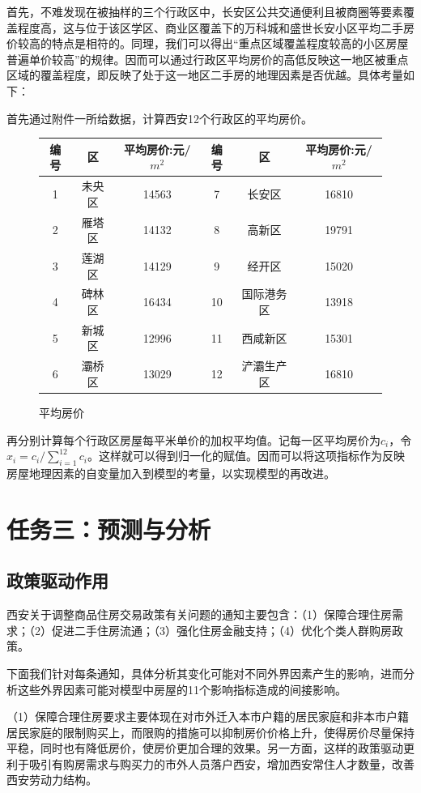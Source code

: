 \documentclass[withoutpreface,bwprint]{cumcmthesis} %
\begin{document}
首先，不难发现在被抽样的三个行政区中，长安区公共交通便利且被商圈等要素覆盖程度高，这与位于该区学区、商业区覆盖下的万科城和盛世长安小区平均二手房价较高的特点是相符的。同理，我们可以得出“重点区域覆盖程度较高的小区房屋普遍单价较高”的规律。因而可以通过行政区平均房价的高低反映这一地区被重点区域的覆盖程度，即反映了处于这一地区二手房的地理因素是否优越。具体考量如下：

首先通过附件一所给数据，计算西安12个行政区的平均房价。
\begin{figure}[H]
    \centering
    \begin{tabular}{cccccc}
    \toprule
    编号&区 & 平均房价:元/$m^2$&编号&区&平均房价:元/$m^2$\\
    \midrule
        1&未央区 & 14563 &7&长安区 & 16810 \\
        2&雁塔区 & 14132 &8&高新区 & 19791 \\
        3&莲湖区 & 14129 &9&经开区 & 15020 \\
        4&碑林区 & 16434 &10&国际港务区 & 13918 \\
        5&新城区 & 12996 &11&西咸新区  & 15301 \\
        6&灞桥区 & 13029 &12&浐灞生产区 & 16810 \\
    \bottomrule
    \end{tabular}
    \caption{平均房价}
\end{figure}

再分别计算每个行政区房屋每平米单价的加权平均值。记每一区平均房价为$c_i$，令$x_i=c_i/\sum_{i=1}^{12}c_i$。这样就可以得到归一化的赋值。因而可以将这项指标作为反映房屋地理因素的自变量加入到模型的考量，以实现模型的再改进。

\section{任务三：预测与分析}
\subsection{政策驱动作用}
西安关于调整商品住房交易政策有关问题的通知主要包含：（1）保障合理住房需求；（2）促进二手住房流通；（3）强化住房金融支持；（4）优化个类人群购房政策。

下面我们针对每条通知，具体分析其变化可能对不同外界因素产生的影响，进而分析这些外界因素可能对模型中房屋的11个影响指标造成的间接影响。

（1）保障合理住房要求主要体现在对市外迁入本市户籍的居民家庭和非本市户籍居民家庭的限制购买上，而限购的措施可以抑制房价价格上升，使得房价尽量保持平稳，同时也有降低房价，使房价更加合理的效果\cite{RN3}。另一方面，这样的政策驱动更利于吸引有购房需求与购买力的市外人员落户西安，增加西安常住人才数量，改善西安劳动力结构。
\end{document}
